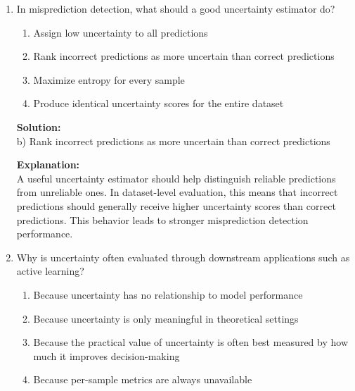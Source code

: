 \documentclass{article}
\begin{document}
\begin{enumerate}
\textbf{Explanation:} \\
The Brier score measures the mean squared difference between predicted probabilities and the true labels. Lower values indicate better calibrated and more accurate probabilistic predictions, while higher values indicate larger mismatch between confidence and correctness.

\vspace{2mm}

\item In misprediction detection, what should a good uncertainty estimator do?

\begin{enumerate}
    \item Assign low uncertainty to all predictions
    \item Rank incorrect predictions as more uncertain than correct predictions
    \item Maximize entropy for every sample
    \item Produce identical uncertainty scores for the entire dataset
\end{enumerate}

\textbf{Solution:} \\
b) Rank incorrect predictions as more uncertain than correct predictions

\textbf{Explanation:} \\
A useful uncertainty estimator should help distinguish reliable predictions from unreliable ones. In dataset-level evaluation, this means that incorrect predictions should generally receive higher uncertainty scores than correct predictions. This behavior leads to stronger misprediction detection performance.

\vspace{2mm}

\item Why is uncertainty often evaluated through downstream applications such as active learning?

\begin{enumerate}
    \item Because uncertainty has no relationship to model performance
    \item Because uncertainty is only meaningful in theoretical settings
    \item Because the practical value of uncertainty is often best measured by how much it improves decision-making
    \item Because per-sample metrics are always unavailable
\end{enumerate}


\end{enumerate}
\end{document}
